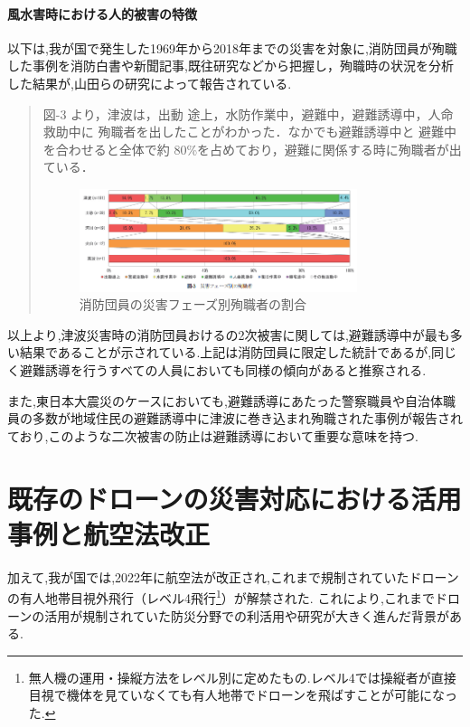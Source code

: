 \paragraph{風水害時における人的被害の特徴}
以下は,我が国で発生した1969年から2018年までの災害を対象に,消防団員が殉職した事例を消防白書や新聞記事,既往研究などから把握し，殉職時の状況を分析した結果が,山田らの研究\cite{yamada2020}によって報告されている.
\begin{quote}
  図-3 より，津波は，出動 途上，水防作業中，避難中，避難誘導中，人命救助中に 殉職者を出したことがわかった．なかでも避難誘導中と 避難中を合わせると全体で約 80\%を占めており，避難に関係する時に殉職者が出ている．
  \begin{figure}[H] 
    \centering 
    \includegraphics[width=0.8\textwidth]{Figures/fig-01.png}
    \caption{消防団員の災害フェーズ別殉職者の割合} 
    \label{fig:01} 
  \end{figure}
\end{quote}
以上より,津波災害時の消防団員おけるの2次被害に関しては,避難誘導中が最も多い結果であることが示されている.上記は消防団員に限定した統計であるが,同じく避難誘導を行うすべての人員においても同様の傾向があると推察される.\par
また,東日本大震災のケースにおいても,避難誘導にあたった警察職員や自治体職員の多数が地域住民の避難誘導中に津波に巻き込まれ殉職された事例\cite{touhoku-01}が報告されており,このような二次被害の防止は避難誘導において重要な意味を持つ.

\section{既存のドローンの災害対応における活用事例と航空法改正}
加えて,我が国では,2022年に航空法が改正され,これまで規制されていたドローンの有人地帯目視外飛行（レベル4飛行\footnote{無人機の運用・操縦方法をレベル別に定めたもの.レベル4では操縦者が直接目視で機体を見ていなくても有人地帯でドローンを飛ばすことが可能になった.}）が解禁された.
これにより,これまでドローンの活用が規制されていた防災分野での利活用や研究が大きく進んだ背景がある.\par 

